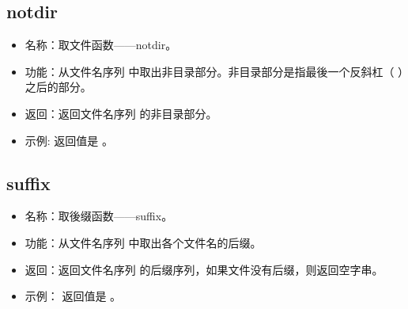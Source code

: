 \documentclass[a4paper,10pt]{sphinxmanual}
\begin{document}
\subsection{notdir}
\label{\detokenize{functions:notdir}}
\begin{sphinxVerbatim}[commandchars=\\\{\}]
 \PYGZlt{}\PYGZgt{}
\end{sphinxVerbatim}
\begin{itemize}
\item {} 
名称：取文件函数——notdir。

\item {} 
功能：从文件名序列  中取出非目录部分。非目录部分是指最後一个反斜杠（ \sphinxcode{\sphinxupquote{/}} ）之后的部分。

\item {} 
返回：返回文件名序列  的非目录部分。

\item {} 
示例:   返回值是  。

\end{itemize}


\subsection{suffix}
\label{\detokenize{functions:suffix}}
\begin{sphinxVerbatim}[commandchars=\\\{\}]
 \PYGZlt{}\PYGZgt{}
\end{sphinxVerbatim}
\begin{itemize}
\item {} 
名称：取後缀函数——suffix。

\item {} 
功能：从文件名序列  中取出各个文件名的后缀。

\item {} 
返回：返回文件名序列  的后缀序列，如果文件没有后缀，则返回空字串。

\item {} 
示例：  返回值是 。

\end{itemize}
\end{document}
